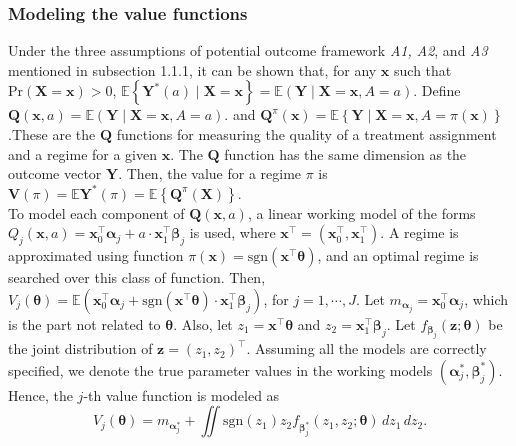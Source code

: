 \documentclass[12pt]{article}
\newcommand{\itl}{\intercal}
\newcommand{\bs}{ \boldsymbol}
\newcommand{\mb}{\mathbb}
\newcommand{\txt}{\text}
\newcommand{\lt}{\left}
\newcommand{\rt}{\right}
\newcommand{\tsgn}{\txt{sgn}}
\begin{document}
\subsubsection{Modeling the value functions}
Under the three assumptions of potential outcome framework \textit{A1, A2}, and \textit{A3} mentioned in subsection 1.1.1, it can be shown that, for any $\bs{x}$ such that $\text{Pr}(\bs{X}=\bs{x})>0$, $\mathbb{E}\lt\{ \bs{Y}^{*}(a)\mid\bs{X}=\bs{x}\rt\} =\mathbb{E}\lt(\bs{Y}\mid\bs{X}=\bs{x},A=a\rt)$. Define $\bs{Q}(\bs{x},a)=\mathbb{E}\lt(\bs{Y}\mid\bs{X}=\bs{x},A=a\rt)$. and $\bs{Q}^{\pi}(\bs{x})=\mathbb{E}\lt\{\bs{Y}\mid\bs{X}=\bs{x},A=\pi(\bs{x})\rt\}$.These are the $\bs{Q}$ functions for measuring the quality of a treatment assignment and a regime for a given $\bs{x}$. The $\bs{Q}$ function has the same dimension as the outcome vector $\bs{Y}$. Then, the value for a regime $\pi$ is $\bs{V}(\pi) = \mb{E} {\bs{Y}^{*}\lt(\pi\rt)} = \mb{E}\lt\{ \bs{Q}^{\pi}\lt(\bs{X}\rt)\rt\}$. \\

To model each component of $\bs{Q}\lt(\bs{x}, a\rt)$, a linear working model of the forms $Q_{j}\lt(\bs{x},a\rt)=\bs{x}_{0}^{\itl}\bs{\alpha}_{j}+a\cdot\bs{x}_{1}^{\itl}\bs{\beta}_{j}$ is used, where $\bs{x}^{\itl}=\lt(\bs{x}_{0}^{\itl},\bs{x}_{1}^{\itl}\rt)$. A regime is approximated using function $\pi(\bs{x}) = \tsgn(\bs{x}^{\itl}\bs{\theta})$, and an optimal regime is searched over this class of function. Then, $V_j(\bs{\theta}) = \mb{E}\lt(\bs{x}_{0}^{\itl}\bs{\alpha}_{j}+\tsgn(\bs{x}^{\itl}\bs{\theta})\cdot\bs{x}_{1}^{\itl}\bs{\beta}_{j}\rt)$, for $j = 1, \cdots, J$. Let $m_{\bs{\alpha}_j} = \bs{x}^{\itl}_0 \bs{\alpha}_j$, which is the part not related to $\bs{\theta}$. Also, let $z_1 = \bs{x}^{\itl}\bs{\theta}$ and $z_2 = \bs{x}_{1}^{\itl}\bs{\beta}_{j}$. Let $f_{\bs{\beta}_j}\lt(\bs{z}; \bs{\theta}\rt)$ be the joint distribution of $\bs{z} = (z_1, z_2)^{\itl}$. Assuming all the models are correctly specified, we denote the true parameter values in the working models $\lt( \bs{\alpha}_{j}^{*}, \bs{\beta}_{j}^{*} \rt)$. Hence, the $j$-th value function is modeled as $$V_j\lt(\bs{\theta}\rt) = m_{\bs{\alpha}^*_j}+ \iint \tsgn\lt(z_1\rt)z_2 f_{\bs{\beta}^*_j}\lt(z_1, z_2; \bs{\theta}\rt) \,dz_1 \,dz_2.$$ 
\end{document}
